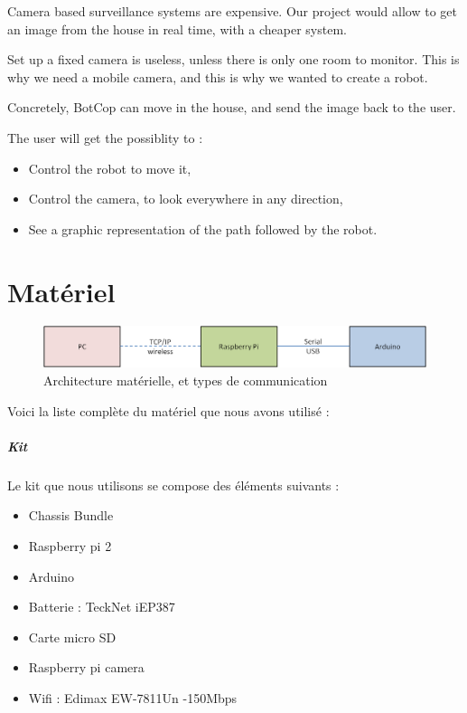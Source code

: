 \documentclass[12pt,a4paper]{report}
\begin{document}
Camera based surveillance systems are expensive. Our project would allow to get an image from the house in real time, with a cheaper system.

Set up a fixed camera is useless, unless there is only one room to monitor. This is why we need a mobile camera, and this is why we wanted to create a robot.

Concretely, BotCop can move in the house, and send the image back to the user.

The user will get the possiblity to :

\bigbreak
\begin{itemize}
\item Control the robot to move it,
\item Control the camera, to look everywhere in any direction,
\item See a graphic representation of the path followed by the robot.
\end{itemize}


\chapter{Matériel} \label{Matériel}

\begin{figure}[hf!]
\center
\includegraphics[scale=0.8]{images/ArchitectureMaterielle.png}
\caption{Architecture matérielle, et types de communication}
\end{figure}

Voici la liste complète du matériel que nous avons utilisé :

\paragraph{Kit} Le kit que nous utilisons se compose des éléments suivants :

\begin{itemize}
\item Chassis Bundle
\item Raspberry pi 2
\item Arduino
\item Batterie : TeckNet iEP387
\item Carte micro SD
\item Raspberry pi camera
\item Wifi : Edimax EW-7811Un -150Mbps
\end{itemize}
\end{document}
